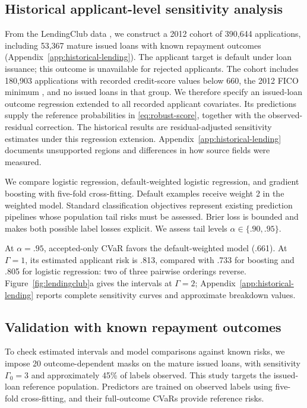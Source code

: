 \subsection{Historical applicant-level sensitivity analysis}
\label{sec:historical}
From the LendingClub data \citep{george2019lendingclub}, we construct a 2012 cohort of 390,644 applications, including 53,367 mature issued loans with known repayment outcomes (Appendix~\ref{app:historical-lending}). The applicant target is
default under loan issuance; this outcome is unavailable for rejected applicants. The cohort
includes 180,903 applications with recorded credit-score values below 660, the 2012 FICO
minimum \citep{lendingclub2012registration}, and no issued loans in that group. We therefore
specify an issued-loan outcome regression extended to all recorded applicant covariates. Its
predictions supply the reference probabilities in \eqref{eq:robust-score}, together with the
observed-residual correction. The historical results are residual-adjusted sensitivity
estimates under this regression extension. Appendix~\ref{app:historical-lending} documents
unsupported regions and differences in how source fields were measured.

We compare logistic regression, default-weighted logistic regression, and gradient boosting
with five-fold cross-fitting. Default examples receive weight 2 in the weighted model.
Standard classification objectives represent existing prediction pipelines whose population
tail risks must be assessed. Brier loss is bounded and makes both possible label losses
explicit. We assess tail levels $\alpha\in\{.90,.95\}$.

At $\alpha=.95$, accepted-only CVaR favors the default-weighted model (.661). At $\Gamma=1$,
its estimated applicant risk is .813, compared with .733 for boosting and .805 for logistic
regression: two of three pairwise orderings reverse. Figure~\ref{fig:lendingclub}a gives the
intervals at $\Gamma=2$; Appendix~\ref{app:historical-lending} reports complete sensitivity
curves and approximate breakdown values.

\subsection{Validation with known repayment outcomes}
\label{sec:known-outcomes}
To check estimated intervals and model comparisons against known risks, we impose 20 outcome-dependent masks on the mature issued loans, with sensitivity $\Gamma_0=3$ and approximately 45\% of labels observed. This study targets the issued-loan
reference population. Predictors are trained on observed labels using five-fold
cross-fitting, and their full-outcome CVaRs provide reference risks.

